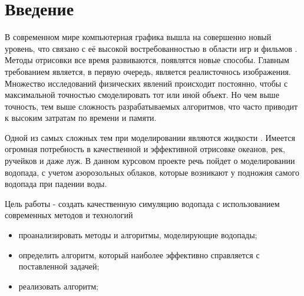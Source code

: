 \chapter*{Введение}

В современном мире компьютерная графика вышла на совершенно новый уровень, что связано с её высокой востребованностью в области игр и фильмов \cite{realistic-water}. Методы отрисовки все время развиваются, появлятся новые способы. Главным требованием является, в первую очередь, является реалисточнось изображения. Множество исследований физических явлений происходит постоянно, чтобы с максимальной точностью смоделировать тот или иной объект. Но чем выше точность, тем выше сложность разрабатываемых алгоритмов, что часто приводит к высоким затратам по времени и памяти.

Одной из самых сложных тем при моделировании являются жидкости \cite{water-matters}. Имеется огромная потребность в качественной и эффективной отрисовке океанов, рек, ручейков и даже луж. В данном курсовом проекте речь пойдет о моделировании водопада, с учетом аэорозольных облаков, которые возникают у подножия самого водопада при падении воды.

Цель работы - создать качественную симуляцию водопада с использованием современных методов и технологий

\begin{itemize}
	\item проанализировать методы и алгоритмы, моделирующие водопады; 
	\item определить алгоритм, который наиболее эффективно справляется с поставленной задачей; 
	\item реализовать алгоритм;
\end{itemize}

